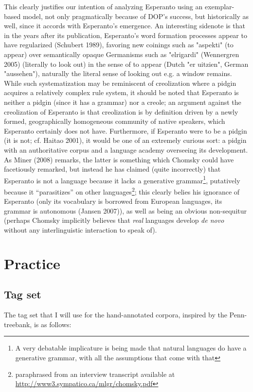 \documentclass[10pt,a4paper]{article}
\begin{document}
This clearly justifies our intention of analyzing Esperanto using an
exemplar-based model, not only pragmatically because of DOP's success, but
historically as well, since it accords with Esperanto's emergence. An
interesting sidenote is that in the years after its publication, Esperanto's
word formation processes appear to have regularized (Schubert 1989), favoring
new coinings such as "aspekti" (to appear) over semantically opaque Germanisms
such as "elrigardi" (Wennergren 2005) (literally to look out) in the sense of
to appear (Dutch "er uitzien", German "aussehen"), naturally the literal sense
of looking out e.g. a window remains. While such systematization may be reminiscent of
creolization where a pidgin acquires a relatively complex rule system, it should be
noted that Esperanto is neither a pidgin (since it has a grammar) nor a creole; an
argument against the creolization of Esperanto is that creolization
is by definition driven by a newly formed, geographically homogeneous community
of native speakers, which Esperanto certainly does not have. Furthermore, if
Esperanto were to be a pidgin (it is not; cf.  Haitao 2001), it would be one of
an extremely curious sort: a pidgin with an authoritative corpus and a language
academy overseeing its development. As Miner (2008) remarks, the latter is
something which Chomsky could have facetiously remarked, but instead he has claimed
(quite incorrectly) that Esperanto is not a language because it lacks a generative
grammar\footnote{A very debatable implicature is being made that natural
languages do have a generative grammar, with all the assumptions that come with
that}, putatively because it ``parasitizes'' on other
languages\footnote{paraphrased from an interview transcript available at
\url{http://www3.sympatico.ca/mlgr/chomsky.pdf}}; this clearly belies his
ignorance of Esperanto (only its vocabulary is borrowed from European
languages, its grammar is autonomous (Jansen 2007)), as well as being an
obvious non-sequitur (perhaps Chomsky implicitly believes that {\em real}
languages develop {\em de novo} without any interlinguistic interaction to
speak of).

\pagebreak
\section{Practice}
\subsection{Tag set}

The tag set that I will use for the hand-annotated corpora, 
inspired by the Penn-treebank, is as follows:
\end{document}
